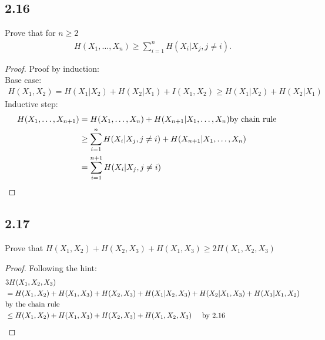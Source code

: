 \documentclass[../main.tex]{subfiles}
\begin{document}
\subsection*{2.16}
Prove that for $n\geq 2$\begin{align*}
    H(X_1,\dots,X_n)\geq \sum_{i=1}^{n} H(X_i|X_j,j\neq i).
\end{align*}
\begin{proof}
    Proof by induction:\\
    Base case: \begin{align*}
        H(X_1,X_2)=H(X_1|X_2)+H(X_2|X_1)+I(X_1,X_2)
        \geq H(X_1|X_2)+H(X_2|X_1)
    \end{align*}
    Inductive step:
    \begin{align*}
        H(X_1,\dots,X_{n+1})&=H(X_1,\dots,X_n)+H(X_{n+1}|X_1,\dots,X_n) \hspace{5mm\text{by chain rule}}\\
        &\geq \sum_{i=1}^n H(X_i|X_j, j\neq i)+H(X_{n+1}|X_1,\dots,X_n)\\
        &= \sum_{i=1}^{n+1} H(X_i|X_j, j\neq i)
    \end{align*}
\end{proof}
\subsection*{2.17}
Prove that $H(X_1,X_2)+H(X_2,X_3)+H(X_1,X_3)\geq 2H(X_1,X_2,X_3)$
\begin{proof}
    Following the hint:
    \begin{align*}
        &3H(X_1,X_2,X_3)\\
        &=H(X_1,X_2)+H(X_1,X_3)+H(X_2,X_3)+H(X_1|X_2,X_3)+H(X_2|X_1,X_3)+H(X_3|X_1,X_2)\\
        &\text{by the chain rule}\\
        &\leq H(X_1,X_2)+H(X_1,X_3)+H(X_2,X_3)+H(X_1,X_2,X_3) \hspace{5mm}\text{by 2.16}
    \end{align*}
\end{proof}
\end{document}

